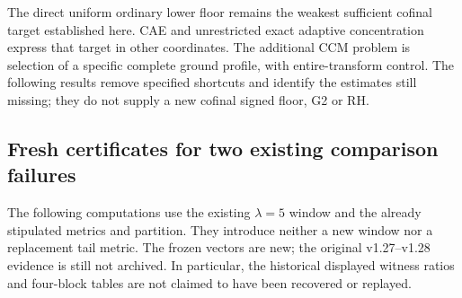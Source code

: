 \documentclass[11pt]{article}
\theoremstyle{remark}
\begin{document}
The direct uniform ordinary lower floor remains the weakest sufficient
cofinal target established here. CAE and unrestricted exact adaptive
concentration express that target in other coordinates. The additional
CCM problem is selection of a specific complete ground profile, with
entire-transform control. The following results remove specified
shortcuts and identify the estimates still missing; they do not supply
a new cofinal signed floor, G2 or RH.



\subsection*{Fresh certificates for two existing comparison failures}

The following computations use the existing $\lambda=5$ window and
the already stipulated metrics and partition. They introduce neither a
new window nor a replacement tail metric. The frozen vectors are new;
the original v1.27--v1.28 evidence is still not archived. In particular,
the historical displayed witness ratios and four-block tables are not
claimed to have been recovered or replayed.
\end{document}
